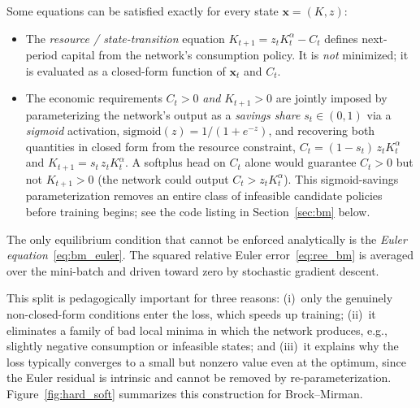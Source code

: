 \documentclass[11pt,a4paper]{report}
\newcommand{\x}{\bm{x}}
\begin{document}
\begin{description}[itemsep=3pt, leftmargin=1.4em]
\item[Hard constraints — encoded in the architecture (never in the loss).]  Some equations can be satisfied exactly for every state $\x = (K,z)$:
  \begin{itemize}\itemsep1pt
  \item The \emph{resource / state-transition} equation $K_{t+1} = z_t K_t^\alpha - C_t$ defines next-period capital from the network's consumption policy.  It is \emph{not} minimized; it is evaluated as a closed-form function of $\x_t$ and $C_t$.
  \item The economic requirements $C_t > 0$ \emph{and} $K_{t+1} > 0$ are jointly imposed by parameterizing the network's output as a \emph{savings share} $s_t \in (0,1)$ via a \emph{sigmoid} activation, $\mathrm{sigmoid}(z) = 1/(1+e^{-z})$, and recovering both quantities in closed form from the resource constraint, $C_t = (1-s_t)\,z_t K_t^\alpha$ and $K_{t+1} = s_t\,z_t K_t^\alpha$.  A softplus head on $C_t$ alone would guarantee $C_t>0$ but not $K_{t+1}>0$ (the network could output $C_t > z_t K_t^\alpha$).  This sigmoid-savings parameterization removes an entire class of infeasible candidate policies before training begins; see the code listing in Section~\ref{sec:bm} below.
  \end{itemize}
\item[Soft constraint — minimized in the loss.]
  The only equilibrium condition that cannot be enforced analytically is the \emph{Euler equation}~\eqref{eq:bm_euler}.  The squared relative Euler error~\eqref{eq:ree_bm} is averaged over the mini-batch and driven toward zero by stochastic gradient descent.
\end{description}

This split is pedagogically important for three reasons: (i)~only the genuinely non-closed-form conditions enter the loss, which speeds up training; (ii)~it eliminates a family of bad local minima in which the network produces, e.g., slightly negative consumption or infeasible states; and (iii)~it explains why the loss typically converges to a small but nonzero value even at the optimum, since the Euler residual is intrinsic and cannot be removed by re-parameterization.  Figure~\ref{fig:hard_soft} summarizes this construction for Brock--Mirman.
\end{document}
